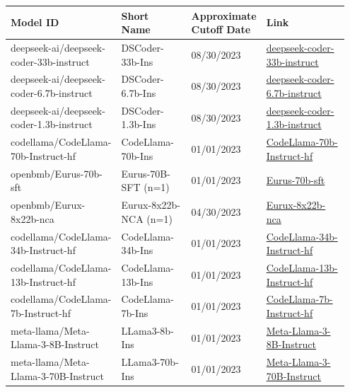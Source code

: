 \begin{longtable}{|p{0.3\linewidth}|p{0.22\linewidth}|p{0.15\linewidth}|p{0.28\linewidth}|}
    \hline
    \textbf{Model ID} & \textbf{Short Name} & \textbf{Approximate Cutoff Date} & \textbf{Link} \\
    \hline
deepseek-ai/deepseek-coder-33b-instruct & DSCoder-33b-Ins & 08/30/2023 & \href{https://huggingface.co/deepseek-ai/deepseek-coder-33b-instruct}{deepseek-coder-33b-instruct} \\ 
deepseek-ai/deepseek-coder-6.7b-instruct & DSCoder-6.7b-Ins & 08/30/2023 & \href{https://huggingface.co/deepseek-ai/deepseek-coder-6.7b-instruct}{deepseek-coder-6.7b-instruct} \\ 
deepseek-ai/deepseek-coder-1.3b-instruct & DSCoder-1.3b-Ins & 08/30/2023 & \href{https://huggingface.co/deepseek-ai/deepseek-coder-1.3b-instruct}{deepseek-coder-1.3b-instruct} \\ 
codellama/CodeLlama-70b-Instruct-hf & CodeLlama-70b-Ins & 01/01/2023 & \href{https://huggingface.co/codellama/CodeLlama-70b-Instruct-hf}{CodeLlama-70b-Instruct-hf} \\ 
openbmb/Eurus-70b-sft & Eurus-70B-SFT (n=1) & 01/01/2023 & \href{https://huggingface.co/openbmb/Eurus-70b-sft}{Eurus-70b-sft} \\ 
openbmb/Eurux-8x22b-nca & Eurux-8x22b-NCA (n=1) & 04/30/2023 & \href{https://huggingface.co/openbmb/Eurux-8x22b-nca}{Eurux-8x22b-nca} \\ 
codellama/CodeLlama-34b-Instruct-hf & CodeLlama-34b-Ins & 01/01/2023 & \href{https://huggingface.co/codellama/CodeLlama-34b-Instruct-hf}{CodeLlama-34b-Instruct-hf} \\ 
codellama/CodeLlama-13b-Instruct-hf & CodeLlama-13b-Ins & 01/01/2023 & \href{https://huggingface.co/codellama/CodeLlama-13b-Instruct-hf}{CodeLlama-13b-Instruct-hf} \\ 
codellama/CodeLlama-7b-Instruct-hf & CodeLlama-7b-Ins & 01/01/2023 & \href{https://huggingface.co/codellama/CodeLlama-7b-Instruct-hf}{CodeLlama-7b-Instruct-hf} \\ 
meta-llama/Meta-Llama-3-8B-Instruct & LLama3-8b-Ins & 01/01/2023 & \href{https://huggingface.co/meta-llama/Meta-Llama-3-8B-Instruct}{Meta-Llama-3-8B-Instruct} \\ 
meta-llama/Meta-Llama-3-70B-Instruct & LLama3-70b-Ins & 01/01/2023 & \href{https://huggingface.co/meta-llama/Meta-Llama-3-70B-Instruct}{Meta-Llama-3-70B-Instruct} \\ 

\end{longtable}
